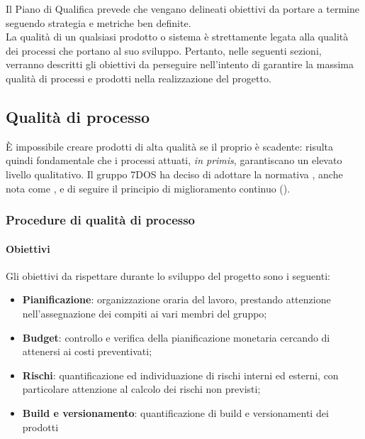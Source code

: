 Il Piano di Qualifica prevede che vengano delineati obiettivi da portare a termine seguendo strategia e metriche ben definite.\\
La qualità di un qualsiasi prodotto o sistema è strettamente legata alla qualità dei processi che portano al suo sviluppo. Pertanto, nelle seguenti sezioni, verranno descritti gli obiettivi da perseguire nell'intento di garantire la massima qualità di processi e prodotti nella realizzazione del progetto.

\subsection{Qualità di processo}
	È impossibile creare prodotti di alta qualità se il proprio  è scadente: risulta quindi fondamentale che i processi attuati, \emph{in primis}, garantiscano un elevato livello qualitativo. Il gruppo 7DOS ha deciso di adottare la normativa , anche nota come , e di seguire il principio di miglioramento continuo (). 


\subsubsection{Procedure di qualità di processo}

\paragraph{Obiettivi}
Gli obiettivi da rispettare durante lo sviluppo del progetto sono i seguenti:

\begin{itemize}
	\item{\textbf{Pianificazione}: organizzazione oraria del lavoro, prestando attenzione nell'assegnazione dei compiti ai vari membri del gruppo;
	}
	\item{\textbf{Budget}: controllo e verifica della pianificazione monetaria cercando di attenersi ai costi preventivati;
	}
	\item{\textbf{Rischi}: quantificazione ed individuazione di rischi interni ed esterni, con particolare attenzione al calcolo dei rischi non previsti;
	}
	\item{\textbf{Build e versionamento}: quantificazione di build e versionamenti dei prodotti
	}
\end{itemize}


